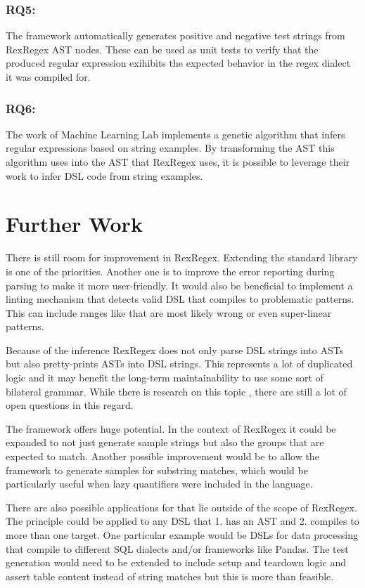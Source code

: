 \subsubsection{RQ5: \RQfive}

The \utgast{} framework automatically generates positive and negative test strings from RexRegex AST nodes. These can be used as unit tests to verify that the produced regular expression exihibits the expected behavior in the regex dialect it was compiled for.

\subsubsection{RQ6: \RQsix}

The work of Machine Learning Lab implements a genetic algorithm that infers regular expressions based on string examples. By transforming the AST this algorithm uses into the AST that RexRegex uses, it is possible to leverage their work to infer DSL code from string examples.

\section{Further Work}

There is still room for improvement in RexRegex. Extending the standard library is one of the priorities. Another one is to improve the error reporting during parsing to make it more user-friendly. It would also be beneficial to implement a linting mechanism that detects valid DSL that compiles to problematic patterns. This can include ranges like  that are most likely wrong or even super-linear patterns.

Because of the inference RexRegex does not only parse DSL strings into ASTs but also pretty-prints ASTs into DSL strings. This represents a lot of duplicated logic and it may benefit the long-term maintainability to use some sort of bilateral grammar. While there is research on this topic \cite{BidirectionalGrammarsForMachineCode}\cite{GuidedGrammarConvergence}, there are still a lot of open questions in this regard.

The \utgast{} framework offers huge potential. In the context of RexRegex it could be expanded to not just generate sample strings but also the groups that are expected to match. Another possible improvement would be to allow the framework to generate samples for substring matches, which would be particularly useful when lazy quantifiers were included in the language.

There are also possible applications for \utgast{} that lie outside of the scope of RexRegex. The principle could be applied to any DSL that 1. has an AST and 2. compiles to more than one target. One particular example would be DSLs for data processing that compile to different SQL dialects and/or frameworks like Pandas. The test generation would need to be extended to include setup and teardown logic and assert table content instead of string matches but this is more than feasible. 
